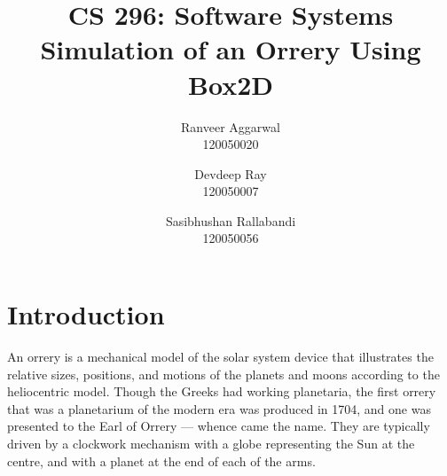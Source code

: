 \documentclass[11pt]{article}
\title{CS 296: Software Systems \\ Simulation of an Orrery Using Box2D}
\author{Ranveer Aggarwal \\ 120050020 \and Devdeep Ray \\ 120050007 \and Sasibhushan Rallabandi \\ 120050056}
\begin{document}
\maketitle

\section{Introduction}
An orrery is a mechanical model of the solar system device that illustrates the relative sizes, positions, and motions of the planets and moons according to the heliocentric model. Though the Greeks had working planetaria, the first orrery that was a planetarium of the modern era was produced in 1704, and one was presented to the Earl of Orrery — whence came the name. They are typically driven by a clockwork mechanism with a globe representing the Sun at the centre, and with a planet at the end of each of the arms.
\pagebreak
\end{document}

